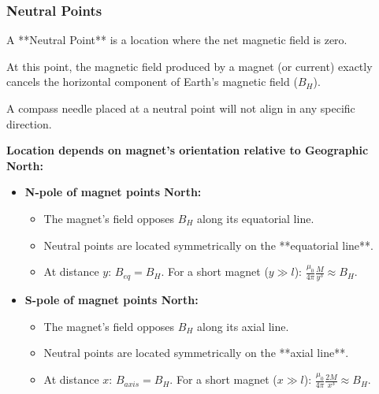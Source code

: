 \begin{frame}[t]
    \frametitle{\textcolor{deepnavy}{\textbf{Neutral Points}}}
    \renewcommand{\familydefault}{\rmdefault}
    \small

      \item<+-> A **Neutral Point** is a location where the net magnetic field is zero.
      \item<+-> At this point, the magnetic field produced by a magnet (or current) exactly cancels the horizontal component of Earth's magnetic field ($B_H$).
      \item<+-> A compass needle placed at a neutral point will not align in any specific direction.

    \item<+-> \textbf{Location depends on magnet's orientation relative to Geographic North:}
        \begin{itemize}
              \item \textbf{N-pole of magnet points North:}
                \begin{itemize}
                    \item The magnet's field opposes $B_H$ along its equatorial line.
                      \item Neutral points are located symmetrically on the **equatorial line**.
                    \item At distance $y$: $B_{eq} = B_H$.   For a short magnet ($y \gg l$): $\frac{\mu_0}{4\pi} \frac{M}{y^3} \approx B_H$.
                \end{itemize} %
              \item \textbf{S-pole of magnet points North:}
                \begin{itemize}
                    \item The magnet's field opposes $B_H$ along its axial line.
                      \item Neutral points are located symmetrically on the **axial line**.
                    \item At distance $x$: $B_{axis} = B_H$.   For a short magnet ($x \gg l$): $\frac{\mu_0}{4\pi} \frac{2M}{x^3} \approx B_H$.
                \end{itemize} %
        \end{itemize}
\end{frame}

